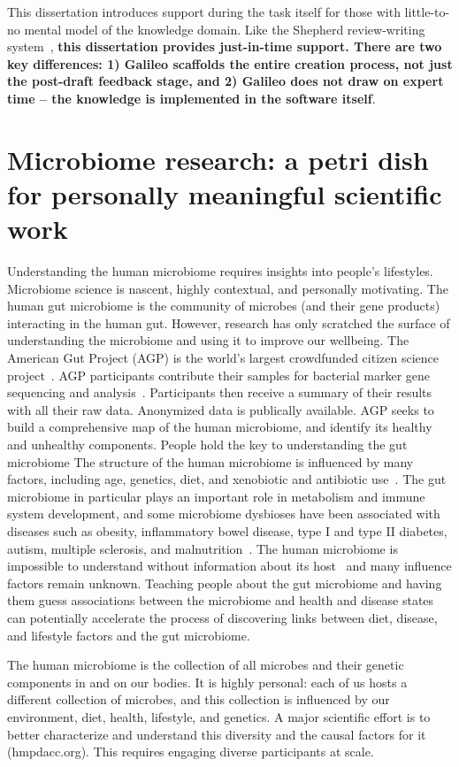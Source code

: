This dissertation introduces support during the task itself for those with little-to-no mental model of the knowledge domain. 
Like the Shepherd review-writing system~\cite{dow2012shepherding}, \textbf {this dissertation provides just-in-time support. 
There are two key differences: 1) Galileo scaffolds the entire creation process, not just the post-draft feedback
 stage, and 2) Galileo does not draw on expert time – the knowledge is implemented in the software itself}. 

\section{Microbiome research: a petri dish for personally meaningful scientific work}
Understanding the human microbiome requires insights
into people’s lifestyles. Microbiome science is nascent, highly contextual, and personally motivating.
The human gut microbiome is the community of microbes
(and their gene products) interacting in the human gut.
However, research has only scratched the surface of understanding the microbiome and using it to improve our wellbeing. The American Gut Project (AGP) is the world's
largest crowdfunded citizen science project~\cite{KnightLab2016a}. AGP
participants contribute their samples for bacterial marker
gene sequencing and analysis~\cite{Debelius2016}. Participants then receive
a summary of their results with all their raw data. Anonymized data is publically available. AGP seeks to build a
comprehensive map of the human microbiome, and identify
its healthy and unhealthy components.
People hold the key to understanding the gut microbiome
The structure of the human microbiome is influenced by
many factors, including age, genetics, diet, and xenobiotic
and antibiotic use~\cite{Gill2006}. The gut microbiome in particular
plays an important role in metabolism and immune system
development, and some microbiome dysbioses have been
associated with diseases such as obesity, inflammatory
bowel disease, type I and type II diabetes, autism, multiple
sclerosis, and malnutrition~\cite{Cho2012}. The human microbiome is
impossible to understand without information about its host~\cite{Debelius2016} and 
many influence factors remain unknown. Teaching
people about the gut microbiome and having them guess
associations between the microbiome and health and disease states can potentially 
accelerate the process of discovering links between diet, disease, and lifestyle factors and
the gut microbiome.

The human microbiome is the collection of all microbes and
their genetic components in and on our bodies. It is highly
personal: each of us hosts a different collection of microbes,
and this collection is influenced by our environment, diet,
health, lifestyle, and genetics. A major scientific effort is to
better characterize and understand this diversity and the
causal factors for it (hmpdacc.org). This requires engaging
diverse participants at scale.

